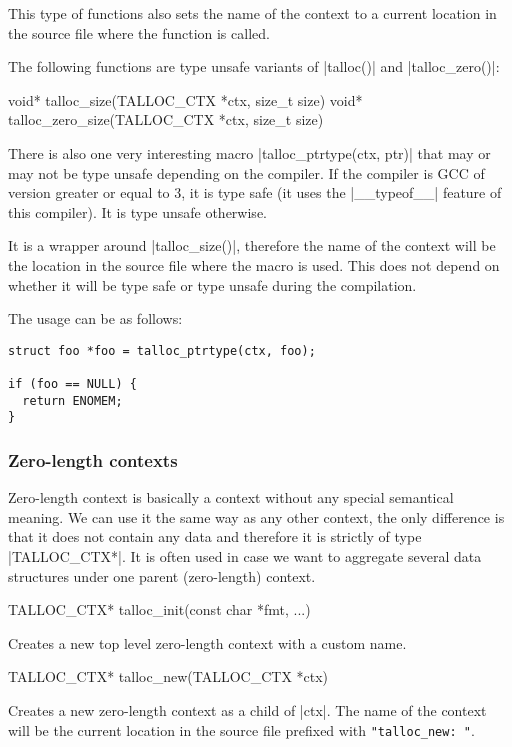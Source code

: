 This type of functions also sets the name of the context to a current location
in the source file where the function is called.

The following functions are type unsafe variants of |talloc()| and
|talloc_zero()|:

\begin{funcproto}
void* talloc_size(TALLOC_CTX *ctx, size_t size)
void* talloc_zero_size(TALLOC_CTX *ctx, size_t size)
\end{funcproto}
\funclistend
There is also one very interesting macro |talloc_ptrtype(ctx, ptr)| that may or
may not be type unsafe depending on the compiler. If the compiler is GCC of
version greater or equal to 3, it is type safe (it uses the |__typeof__|
feature of this compiler). It is type unsafe otherwise.

It is a wrapper around |talloc_size()|, therefore the name of the context will
be the location in the source file where the macro is used. This does not depend
on whether it will be type safe or type unsafe during the compilation.

The usage can be as follows:

\begin{lstlisting}[caption={talloc_ptrtype(ctx, ptr)},label=lst:talloc_ptrtype]
struct foo *foo = talloc_ptrtype(ctx, foo);

if (foo == NULL) {
  return ENOMEM;
}

\end{lstlisting}

\subsubsection{Zero-length contexts}

Zero-length context is basically a context without any special semantical
meaning. We can use it the same way as any other context, the only difference is
that it does not contain any data and therefore it is strictly of type
|TALLOC_CTX*|. It is often used in case we want to aggregate several data
structures under one parent (zero-length) context.

\begin{funcproto}
TALLOC_CTX* talloc_init(const char *fmt, ...)
\end{funcproto}
\begin{funcdesc}
Creates a new top level zero-length context with a custom name.
\end{funcdesc}
\begin{funcproto}
TALLOC_CTX* talloc_new(TALLOC_CTX *ctx)
\end{funcproto}
\begin{funcdesc}
Creates a new zero-length context as a child of |ctx|. The name of the context
will be the current location in the source file prefixed with
\lstinline[showspaces=true]{"talloc_new: "}.
\end{funcdesc}

